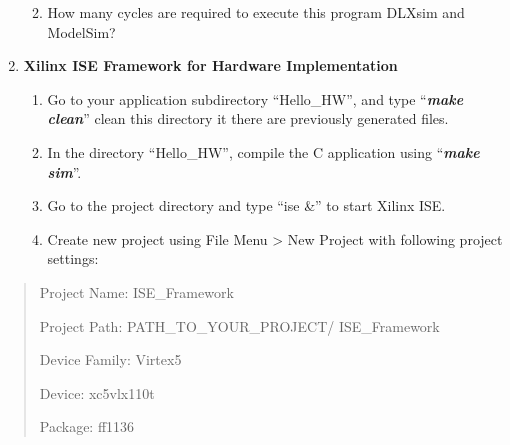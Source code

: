 \documentclass[
]{article}
\begin{document}
\begin{enumerate}
  \begin{enumerate}
  \def\labelenumii{\alph{enumii}.}
  \item
    How many cycles are required to execute this program DLXsim and
    ModelSim?
  \end{enumerate}
\item
  \textbf{Xilinx ISE Framework for Hardware Implementation}

  \begin{enumerate}
  \def\labelenumii{\arabic{enumii}.}
  \item
    Go to your application subdirectory ``Hello\_HW'', and type
    ``\emph{\textbf{make clean}}'' clean this directory it there are
    previously generated files.
  \item
    In the directory ``Hello\_HW'', compile the C application using
    ``\emph{\textbf{make sim}}''.
  \item
    Go to the project directory and type ``ise \&'' to start Xilinx ISE.
  \item
    Create new project using File Menu \textgreater{} New Project with
    following project settings:
  \end{enumerate}
\end{enumerate}

\begin{quote}
Project Name: ISE\_Framework

Project Path: PATH\_TO\_YOUR\_PROJECT/ ISE\_Framework

Device Family: Virtex5

Device: xc5vlx110t

Package: ff1136
\end{quote}
\end{document}
